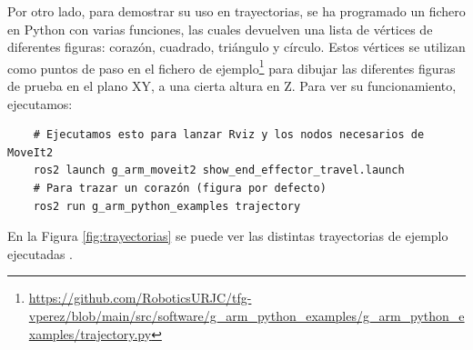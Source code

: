 Por otro lado, para demostrar su uso en trayectorias, se ha programado un fichero en Python con varias funciones, las cuales devuelven una lista de vértices de diferentes 
figuras: corazón, cuadrado, triángulo y círculo. Estos vértices se utilizan como puntos de paso en el fichero de 
ejemplo\footnote{\url{https://github.com/RoboticsURJC/tfg-vperez/blob/main/src/software/g\_arm\_python_examples/g\_arm_python\_examples/trajectory.py}} para 
dibujar las diferentes figuras de prueba en el plano XY, a una cierta altura en Z. Para ver su funcionamiento, ejecutamos:
\begin{verbatim}
    # Ejecutamos esto para lanzar Rviz y los nodos necesarios de MoveIt2
    ros2 launch g_arm_moveit2 show_end_effector_travel.launch 
    # Para trazar un corazón (figura por defecto)
    ros2 run g_arm_python_examples trajectory
\end{verbatim}

En la Figura \ref{fig:trayectorias} se puede ver las distintas trayectorias de ejemplo ejecutadas .

